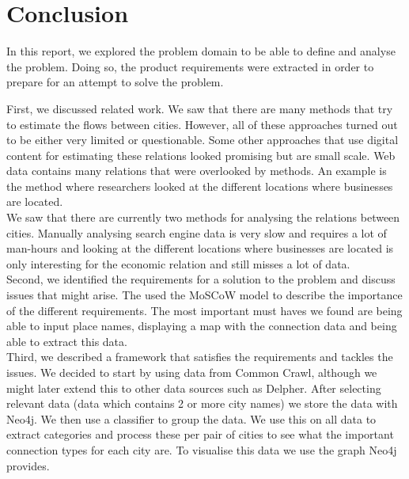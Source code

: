 \chapter{Conclusion}


In this report, we explored the problem domain to be able to define and analyse the problem. Doing so, the product requirements were extracted in order to prepare for an attempt to solve the problem.

First, we discussed related work. We saw that there are many methods that try to estimate the flows between cities. However, all of these approaches turned out to be either very limited or questionable. Some other approaches that use digital content for estimating these relations looked promising but are small scale. Web data contains many relations that were overlooked by methods. An example is the method where researchers looked at the different locations where businesses are located. \\

We saw that there are currently two methods for analysing the relations between cities. Manually analysing search engine data is very slow and requires a lot of man-hours and looking at the different locations where businesses are located is only interesting for the economic relation and still misses a lot of data.
\\

Second, we identified the requirements for a solution to the problem and discuss issues that might arise. The used the MoSCoW model to describe the importance of the different requirements. The most important must haves we found are being able to input place names, displaying a map with the connection data and being able to extract this data.
\\

Third, we described a framework that satisfies the requirements and tackles the issues. We decided to start by using data from Common Crawl, although we might later extend this to other data sources such as Delpher. After selecting relevant data (data which contains 2 or more city names) we store the data with Neo4j. We then use a classifier to group the data. We use this on all data to extract categories and process these per pair of cities to see what the important connection types for each city are. To visualise this data we use the graph Neo4j provides.
\\

